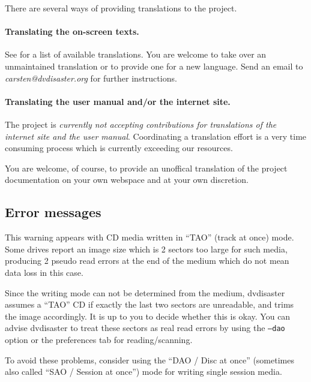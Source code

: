 {There are several ways of providing translations to the project.

  \paragraph{Translating the on-screen texts.} See  for
  a list of available translations. You are welcome to take over an unmaintained
  translation or to provide one for a new language. Send an email to
  {\em carsten@dvdisaster.org} for further instructions.

  \paragraph{Translating the user manual and/or the internet site.} The project
  is {\em currently not accepting contributions for translations of the internet
    site and the user manual}. Coordinating a translation effort is a very time
  consuming process which is currently exceeding our resources. 

  \smallskip
  
  You are welcome, of course, to provide an unoffical translation of the
  project documentation on your own webspace and at your own discretion. }


\subsection{Error messages}
\label{qa-error}
\setcounter{qaitem}{0}

   {This warning appears with CD media written in ``TAO'' (track at once) mode.
     Some drives report an image size which is 2 sectors too large for such media,
     producing 2 pseudo read errors at the end of the medium which do not mean data
     loss in this case.

     \smallskip
     
     Since the writing mode can not be determined from the medium, dvdisaster
     assumes a ``TAO'' CD if exactly the last two sectors are unreadable, and
     trims the image accordingly. It is up to you to decide whether this is okay.
     You can advise dvdisaster to treat these sectors as real read errors by using
     the {\tt --dao} option or the preferences tab for reading/scanning.

     \smallskip
     
     To avoid these problems, consider using the ``DAO / Disc at once''
     (sometimes also called ``SAO / Session at once'') mode for writing single session media.}

